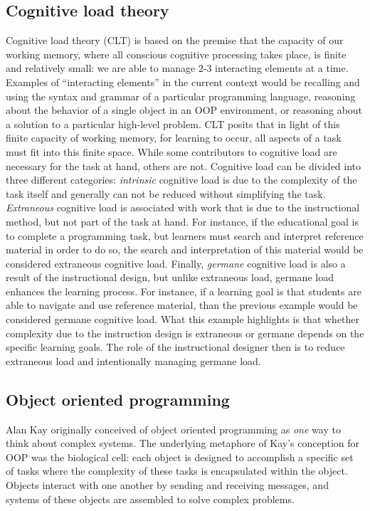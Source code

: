 \documentclass[12pt]{article}
\begin{document}
\subsection{Cognitive load theory}
Cognitive load theory (CLT) is based on the premise that the capacity
of our working memory, where all conscious cognitive processing takes
place, is finite and relatively small: we are able to manage 2-3
interacting elements at a time. Examples of ``interacting elements''
in the current context would be recalling and using the syntax and
grammar of a particular programming language, reasoning about the
behavior of a single object in an OOP environment, or reasoning about
a solution to a particular high-level problem. CLT posits that in
light of this finite capacity of working memory, for learning to
occur, all aspects of a task must fit into this finite space. While
some contributors to cognitive load are necessary for the task at
hand, others are not\autocite{paas_cognitive_2003}. Cognitive load can
be divided into three different categories: \emph{intrinsic} cognitive
load is due to the complexity of the task itself and generally can not
be reduced without simplifying the task. \emph{Extraneous} cognitive
load is associated with work that is due to the instructional method,
but not part of the task at hand. For instance, if the educational
goal is to complete a programming task, but learners must search and
interpret reference material in order to do so, the search and
interpretation of this material would be considered extraneous
cognitive load. Finally, \emph{germane} cognitive load is also a
result of the instructional design, but unlike extraneous load,
germane load enhances the learning process. For instance, if a
learning goal is that students are able to navigate and use reference
material, than the previous example would be considered germane
cognitive load. What this example highlights is that whether
complexity due to the instruction design is extraneous or germane
depends on the specific learning goals. The role of the instructional
designer then is to reduce extraneous load and intentionally managing
germane load.

\subsection{Object oriented programming}
Alan Kay originally conceived of object oriented programming as
\emph{one} way to think about complex
systems\autocite{kay_history_1996}. The underlying metaphore of Kay's
conception for OOP was the biological cell: each object is
designed to accomplish a specific set of tasks where the complexity of
these tasks is encapsulated within the object. Objects interact with
one another by sending and receiving messages, and systems of these
objects are assembled to solve complex
problems\autocite{kay_history_1996}.
\end{document}
